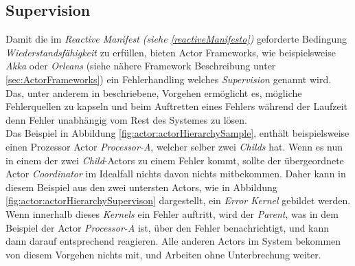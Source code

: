 \subsection{Supervision}\label{actor:supervision}
Damit die im \textit{Reactive Manifest (siehe \ref{reactiveManifesto})} geforderte Bedingung \textit{Wiederstandsfähigkeit} zu erfüllen, bieten Actor Frameworks, wie beispielsweise \textit{Akka} oder \textit{Orleans} (siehe nähere Framework Beschreibung unter \ref{sec:ActorFrameworks}) ein Fehlerhandling welches \textit{Supervision} genannt wird. Das, unter anderem in \cite{sargent2016play} beschriebene, Vorgehen ermöglicht es, mögliche Fehlerquellen zu kapseln und beim Auftretten eines Fehlers während der Laufzeit denn Fehler unabhängig vom Rest des Systemes zu lösen.\\
Das Beispiel in Abbildung \ref{fig:actor:actorHierarchySample}, enthält beispielsweise einen Prozessor Actor \textit{Processor-A}, welcher selber zwei \textit{Childs} hat. Wenn es nun in einem der zwei \textit{Child}-Actors zu einem Fehler kommt, sollte der übergeordnete Actor \textit{Coordinator} im Idealfall nichts davon nichts mitbekommen. Daher kann in diesem Beispiel aus den zwei untersten Actors, wie in Abbildung \ref{fig:actor:actorHierarchySupervison} dargestellt, ein \textit{Error Kernel} gebildet werden. Wenn innerhalb dieses \textit{Kernels} ein Fehler auftritt, wird der \textit{Parent}, was in dem Beispiel der Actor \textit{Processor-A} ist, über den Fehler benachrichtigt, und kann dann darauf entsprechend reagieren. Alle anderen Actors im System bekommen von diesem Vorgehen nichts mit, und Arbeiten ohne Unterbrechung weiter. \\
